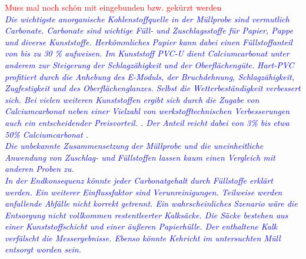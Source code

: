\textcolor{red}{Muss mal noch schön mit eingebunden bzw. gekürzt werden}\\
\textcolor{blue}{\textit{Die wichtigste anorganische Kohlenstoffquelle in der Müllprobe sind vermutlich Carbonate.
Carbonate sind wichtige Füll- und Zuschlagsstoffe für Papier, Pappe und diverse Kunststoffe. Herkömmliches Papier kann dabei einen Füllstoffanteil von bis zu 30 \% \cite{Wikipedia.21.11.2019} aufweisen. Im Kunststoff PVC-U dient Calciumcarbonat unter anderem zur Steigerung der Schlagzähigkeit und der Oberflächengüte. Hart-PVC profitiert durch die Anhebung des E-Moduls, der Bruchdehnung, Schlagzähigkeit, Zugfestigkeit und des Oberflächenglanzes. Selbst die Wetterbeständigkeit verbessert sich. Bei vielen weiteren Kunststoffen ergibt sich durch die Zugabe von Calciumcarbonat neben einer Vielzahl von werkstofftechnischen Verbesserungen auch ein  entscheidender Preisvorteil. \cite{domininghausKunststoffeUndIhre1998}. Der Anteil reicht dabei von 3\% bis etwa 50\% Calciumcarbonat \cite{domininghausKunststoffeUndIhre1998}.\\
Die unbekannte Zusammensetzung der Müllprobe und die uneinheitliche Anwendung von Zuschlag- und Füllstoffen lassen kaum einen Vergleich mit anderen Proben zu. \\
In der Endkonsequenz könnte jeder Carbonatgehalt durch Füllstoffe erklärt werden. Ein weiterer Einflussfaktor sind Verunreinigungen. Teilweise werden anfallende Abfälle nicht korrekt getrennt. Ein wahrscheinliches Szenario wäre die Entsorgung nicht vollkommen restentleerter Kalksäcke. Die Säcke bestehen aus einer Kunststoffschicht und einer äußeren Papierhülle. Der enthaltene Kalk verfälscht die Messergebnisse. Ebenso könnte Kehricht im untersuchten Müll entsorgt worden sein.}}


